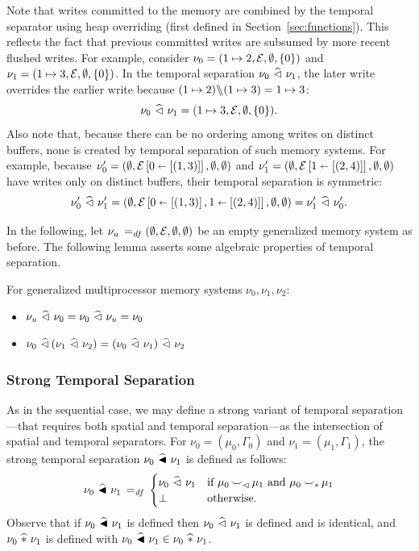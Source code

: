 \documentclass[11pt]{report}
\begin{document}
Note that writes committed to the memory are combined by the temporal separator using heap overriding (first defined in Section~\ref{sec:functions}). This reflects the fact that previous committed writes are subsumed by more recent flushed writes. For example, consider $\nu_0 = (1 \mapsto 2,\arnil,\nil,\set{0})$ and $\nu_1 = (1 \mapsto 3, \arnil, \nil, \set{0})$. In the temporal separation $\nu_0 \mseq \nu_1$, the later write overrides the earlier write because $(1 \mapsto 2) \override (1\mapsto 3) = 1 \mapsto 3$: \[ \nu_0 \mseq \nu_1 = (1 \mapsto 3, \arnil, \nil, \set{0}).\] Also note that, because there can be no ordering among writes on distinct buffers, none is created by temporal separation of such memory systems. For example, because $\nu'_0 = (\nil,\funup{\arnil}{\ptup{0}{\llit{(1,3)}}},\nil,\nil)$ and $\nu'_1 = (\nil,\funup{\arnil}{\ptup{1}{\llit{(2,4)}}},\nil,\nil)$ have writes only on distinct buffers, their temporal separation is symmetric: \[ \nu'_0 \mseq \nu'_1 = (\nil,\funup{\arnil}{\ptup{0}{\llit{(1,3)}},\ptup{1}{\llit{(2,4)}}},\nil,\nil) = \nu'_1 \mseq \nu'_0.\]

In the following, let $\nu_u \eqdef (\nil, \arnil, \nil, \nil)$ be an empty generalized memory system as before. The following lemma asserts some algebraic properties of temporal separation. \begin{lemma}
  \label{lem:temporal-separation-algebra}
  For generalized multiprocessor memory systems $\nu_0, \nu_1, \nu_2$: 
  \begin{itemize}
    \item $\nu_u \mseq \nu_0 = \nu_0 \mseq \nu_u = \nu_0$
    \item $\nu_0 \mseq (\nu_1 \mseq \nu_2) = (\nu_0 \mseq \nu_1) \mseq \nu_2$
  \end{itemize}
\end{lemma}

\subsubsection{Strong Temporal Separation}

As in the sequential case, we may define a strong variant of temporal separation---that requires both spatial and temporal separation---as the intersection of spatial and temporal separators. For $\nu_0 = (\mu_0,\Gamma_0)$ and $\nu_1 = (\mu_1,\Gamma_1)$, the strong temporal separation $\nu_0 \msseq \nu_1$ is defined as follows: \[ \nu_0 \msseq \nu_1 \eqdef \begin{cases}
  \nu_0 \mseq \nu_1 & \text{if $\mu_0 \compat_\seqsym \mu_1$ and $\mu_0 \compat_\sepsym \mu_1$} \\ 
  \bot & \text{otherwise.}
\end{cases}\] Observe that if $\nu_0 \msseq \nu_1$ is defined then $\nu_0 \mseq \nu_1$ is defined and is identical, and $\nu_0 \msep \nu_1$ is defined with $\nu_0 \msseq \nu_1 \in \nu_0 \msep \nu_1$.
\end{document}
